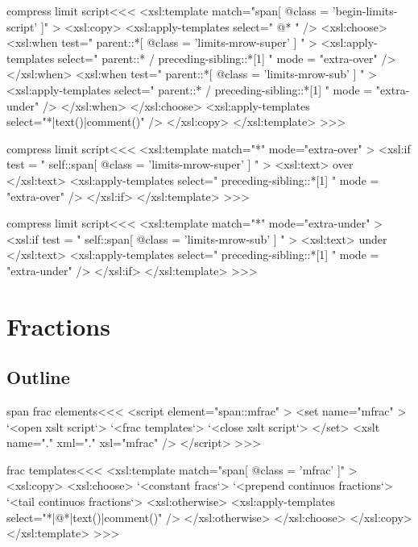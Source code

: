 \documentclass{article}
\begin{document}
\<compress limit script\><<<
<xsl:template match="span[ @class = 'begin-limits-script' ]" >
    <xsl:copy>
       <xsl:apply-templates select=" @* " />
       <xsl:choose>
          <xsl:when test="  
                parent::*[ @class = 'limits-mrow-super'  ]
          " >
              <xsl:apply-templates 
                  select=" parent::* 
                           / preceding-sibling::*[1] " 
                  mode = "extra-over" />
          </xsl:when>
          <xsl:when test="  
                parent::*[ @class = 'limits-mrow-sub'  ]
          " >
              <xsl:apply-templates 
                  select=" parent::* 
                           / preceding-sibling::*[1] " 
                  mode = "extra-under" />
          </xsl:when>
       </xsl:choose>
       <xsl:apply-templates select="*|text()|comment()" />
    </xsl:copy>
</xsl:template> 
>>>



\<compress limit script\><<<
<xsl:template match="*" mode="extra-over" >
   <xsl:if   test = " self::span[ @class = 'limits-mrow-super' ] " >
     <xsl:text> over </xsl:text>
     <xsl:apply-templates select=" preceding-sibling::*[1] " 
                    mode = "extra-over" />
   </xsl:if>
</xsl:template> 
>>>


\<compress limit script\><<<
<xsl:template match="*" mode="extra-under" >
   <xsl:if   test = " self::span[ @class = 'limits-mrow-sub' ] " >
     <xsl:text> under </xsl:text>
     <xsl:apply-templates select=" preceding-sibling::*[1] " 
                    mode = "extra-under" />
   </xsl:if>
</xsl:template> 
>>>






\section{Fractions}

\subsection{Outline}



\<span frac elements\><<<
<script element="span::mfrac" >
  <set name="mfrac" >
     `<open xslt script`>
     `<frac templates`> 
     `<close xslt script`>
  </set>
  <xslt name="." xml="." xsl="mfrac" />
</script> 
>>>

\<frac templates\><<<
<xsl:template match="span[ @class = 'mfrac' ]" >
  <xsl:copy>
    <xsl:choose>
       `<constant fracs`>
       `<prepend continuos fractions`>
       `<tail continuos fractions`>
       <xsl:otherwise>
         <xsl:apply-templates select="*|@*|text()|comment()" />
       </xsl:otherwise>
    </xsl:choose>
  </xsl:copy>
</xsl:template> 
>>>
\end{document}
